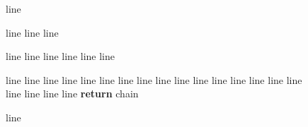 \documentclass{article}
\begin{document}
\begin{figure*}[tb]
\begin{minipage}{0.42\textwidth}
  \vspace{-10px}
  \begin{algorithm}[H]
    \caption{{\color{blue}line}}
    \label{alg:rpc}
  \begin{algorithmic}[1]
    \REQUIRE line
    \STATE line
      \STATE line
    \ENDFOR

      \STATE line
        \STATE line
        \STATE line
        \STATE \hspace{16px} line
        \STATE line
      \ENDFOR
      \STATE line
    \ENDWHILE

  \end{algorithmic}
  \end{algorithm}
  \vspace{-18px}
  \begin{algorithm}[H]
    \caption{{\color{blue}line}}
    \label{alg:replace}
  \begin{algorithmic}[1]
    \REQUIRE line
    \STATE line
    \STATE line
    \STATE line
    \STATE \hspace{8px} line
    \STATE line
    \STATE line
      \STATE \hspace{-4px} line
      \STATE \hspace{-4px} line
      \STATE \hspace{4px} line
      \STATE \hspace{4px} line
      \STATE \hspace{4px} line
      \STATE \hspace{4px} line
      \STATE \hspace{4px} line
      \STATE \hspace{4px} line
      \STATE \hspace{-4px} line
      \STATE \hspace{4px} line
      \STATE \hspace{4px} line
      \STATE \hspace{12px} line
      \STATE \hspace{4px} line
    \ENDWHILE
    \STATE \textbf{return} chain
  \end{algorithmic}
  \end{algorithm}
  \vspace{-18px}\end{minipage}
  \vspace{-5pt}
\end{figure*}
\end{document}
